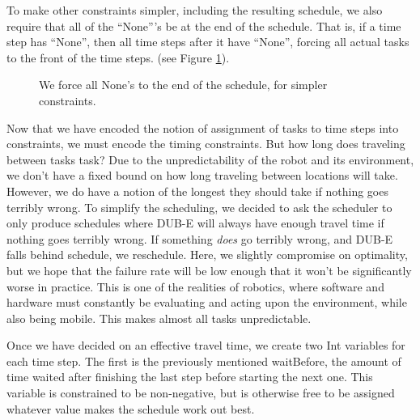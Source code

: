 \documentclass[11pt]{article}
\begin{document}
To make other constraints simpler,
including the resulting schedule,
we also require that all of the ``None'''s
be at the end of the schedule.
That is, if a time step has ``None'',
then all time steps after it have ``None'',
forcing all actual tasks to the front of the time steps.
(see Figure \ref{fig:none-constraints}).
\begin{figure}
  \caption{We force all None's to the end of the schedule, for simpler constraints.}
  \label{fig:none-constraints}
\end{figure}

Now that we have encoded
the notion of assignment of tasks to time steps
into constraints,
we must encode the timing constraints.
But how long does traveling between tasks task?
Due to the unpredictability of the robot and its environment,
we don't have a fixed bound on how long traveling between locations will take.
However, we do have a notion of the longest they should take
if nothing goes terribly wrong.
To simplify the scheduling,
we decided to ask the scheduler to only produce
schedules where DUB-E will always have enough travel time
if nothing goes terribly wrong.
If something \textit{does} go terribly wrong,
and DUB-E falls behind schedule,
we reschedule.
Here, we slightly compromise on optimality,
but we hope that the failure rate
will be low enough that
it won't be significantly worse in practice.
This is one of the realities of robotics, where
software and hardware must constantly be evaluating
and acting upon the environment, while also being mobile.
This makes almost all tasks unpredictable.

Once we have decided on an effective travel time,
we create two Int variables for each time step.
The first is the previously mentioned waitBefore,
the amount of time waited after finishing the last step
before starting the next one.
This variable is constrained to be non-negative,
but is otherwise free to be assigned whatever value
makes the schedule work out best.
\end{document}
